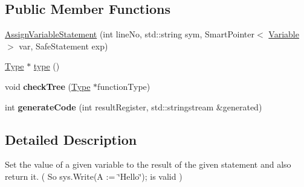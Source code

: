 \subsection*{Public Member Functions}
\begin{DoxyCompactItemize}
\item 
\hyperlink{class_assign_variable_statement_a14d972c625da83a9e83ffeedf99393a1}{Assign\-Variable\-Statement} (int line\-No, std\-::string sym, Smart\-Pointer$<$ \hyperlink{class_variable}{Variable} $>$ var, Safe\-Statement exp)
\item 
\hyperlink{class_type}{Type} $\ast$ \hyperlink{class_assign_variable_statement_a4d153f449edddbaacbd0c0070097b55a}{type} ()
\item 
\hypertarget{class_assign_variable_statement_acb5381cbe2fe10fc2856e2a0f5e541ed}{void {\bfseries check\-Tree} (\hyperlink{class_type}{Type} $\ast$function\-Type)}\label{class_assign_variable_statement_acb5381cbe2fe10fc2856e2a0f5e541ed}

\item 
\hypertarget{class_assign_variable_statement_af6d9c78e3be5c760edb40330236f8bea}{int {\bfseries generate\-Code} (int result\-Register, std\-::stringstream \&generated)}\label{class_assign_variable_statement_af6d9c78e3be5c760edb40330236f8bea}

\end{DoxyCompactItemize}


\subsection{Detailed Description}
Set the value of a given variable to the result of the given statement and also return it. ( So sys.\-Write(A \-:= \char`\"{}\-Hello\char`\"{}); is valid ) 

